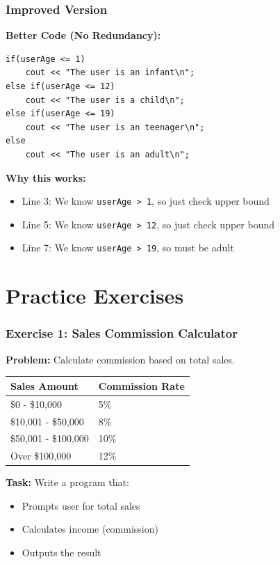 \documentclass{beamer}
\begin{document}
\begin{frame}[fragile]
\frametitle{Improved Version}
\textbf{Better Code (No Redundancy):}

\begin{verbatim}
if(userAge <= 1)
    cout << "The user is an infant\n";
else if(userAge <= 12)
    cout << "The user is a child\n";
else if(userAge <= 19)
    cout << "The user is an teenager\n";
else
    cout << "The user is an adult\n";
\end{verbatim}

\vspace{0.3cm}\pause
\textbf{Why this works:}
\begin{itemize}
    \item Line 3: We know \texttt{userAge > 1}, so just check upper bound
    \item Line 5: We know \texttt{userAge > 12}, so just check upper bound
    \item Line 7: We know \texttt{userAge > 19}, so must be adult
\end{itemize}
\end{frame}

\section{Practice Exercises}

\begin{frame}[fragile]
\frametitle{Exercise 1: Sales Commission Calculator}
\textbf{Problem:} Calculate commission based on total sales.

\vspace{0.2cm}
\begin{tabular}{|l|l|}
\hline
\textbf{Sales Amount} & \textbf{Commission Rate} \\
\hline
\$0 - \$10,000 & 5\% \\
\$10,001 - \$50,000 & 8\% \\
\$50,001 - \$100,000 & 10\% \\
Over \$100,000 & 12\% \\
\hline
\end{tabular}

\vspace{0.3cm}
\textbf{Task:} Write a program that:
\begin{itemize}
    \item Prompts user for total sales
    \item Calculates income (commission)
    \item Outputs the result
\end{itemize}
\end{frame}
\end{document}

